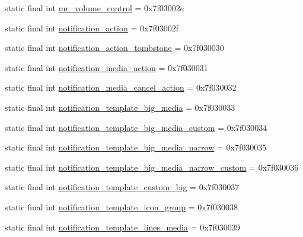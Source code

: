 \begin{CompactItemize}
\item 
static final int \hyperlink{classandroid_1_1support_1_1v7_1_1palette_1_1_r_1_1layout_0c2befc250c0e3787a45a61b1165004e}{mr\_\-volume\_\-control} = 0x7f03002e
\item 
static final int \hyperlink{classandroid_1_1support_1_1v7_1_1palette_1_1_r_1_1layout_7adc172b26b2c5eb6d487ea6b9e73cad}{notification\_\-action} = 0x7f03002f
\item 
static final int \hyperlink{classandroid_1_1support_1_1v7_1_1palette_1_1_r_1_1layout_220bdd46d4a64cd85570979584daa611}{notification\_\-action\_\-tombstone} = 0x7f030030
\item 
static final int \hyperlink{classandroid_1_1support_1_1v7_1_1palette_1_1_r_1_1layout_390196b569b2a6550e0703e8889f03c2}{notification\_\-media\_\-action} = 0x7f030031
\item 
static final int \hyperlink{classandroid_1_1support_1_1v7_1_1palette_1_1_r_1_1layout_7a9b51fc9d0dc136d1a9e941b41d44c4}{notification\_\-media\_\-cancel\_\-action} = 0x7f030032
\item 
static final int \hyperlink{classandroid_1_1support_1_1v7_1_1palette_1_1_r_1_1layout_2d48e4ed728a182002188a4c1c519543}{notification\_\-template\_\-big\_\-media} = 0x7f030033
\item 
static final int \hyperlink{classandroid_1_1support_1_1v7_1_1palette_1_1_r_1_1layout_c79e20d438b8e5dcfdc0eae46f80ba55}{notification\_\-template\_\-big\_\-media\_\-custom} = 0x7f030034
\item 
static final int \hyperlink{classandroid_1_1support_1_1v7_1_1palette_1_1_r_1_1layout_f076a343339a654dc11db31c31b46fc6}{notification\_\-template\_\-big\_\-media\_\-narrow} = 0x7f030035
\item 
static final int \hyperlink{classandroid_1_1support_1_1v7_1_1palette_1_1_r_1_1layout_a6c7c601ca0126af0c428fd50871b687}{notification\_\-template\_\-big\_\-media\_\-narrow\_\-custom} = 0x7f030036
\item 
static final int \hyperlink{classandroid_1_1support_1_1v7_1_1palette_1_1_r_1_1layout_a98dde13170d8e6251ae77fb170a102b}{notification\_\-template\_\-custom\_\-big} = 0x7f030037
\item 
static final int \hyperlink{classandroid_1_1support_1_1v7_1_1palette_1_1_r_1_1layout_f7ae519d6cfc5b864dfdaf3e500224e9}{notification\_\-template\_\-icon\_\-group} = 0x7f030038
\item 
static final int \hyperlink{classandroid_1_1support_1_1v7_1_1palette_1_1_r_1_1layout_bd0d390ebe6a69ed45b882268077268e}{notification\_\-template\_\-lines\_\-media} = 0x7f030039

\end{CompactItemize}
